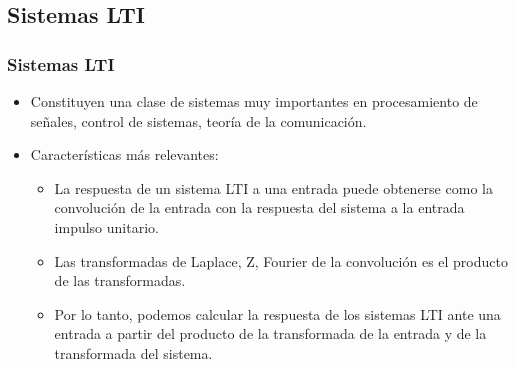 \subsection{Sistemas LTI}

\begin{frame}
\frametitle{Sistemas LTI}

\vspace{-0,3cm}

  \begin{figure}
    \centering
    \small
  \end{figure}

  \begin{itemize}
    \item <1-> Constituyen una clase de sistemas muy importantes en procesamiento de señales, control de sistemas, teoría de la comunicación.

    \item Características más relevantes:

    \begin{itemize}

      \item <1-> La respuesta de un sistema LTI a una entrada puede obtenerse como la \alert{convolución} de la entrada con la respuesta del sistema a la entrada impulso unitario.

      \item <1-> Las \alert{transformadas} de Laplace, Z, Fourier \alert{de la convolución es el producto de las transformadas}. 

      \item Por lo tanto, podemos calcular la respuesta de los sistemas LTI ante una entrada a partir del producto de la transformada de la entrada y de la transformada del sistema. 

    \end{itemize}

  \end{itemize}

  \vspace{-0.4cm}

\end{frame}

